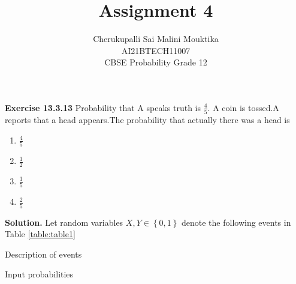 \usepackage{graphicx}
\usepackage{txfonts}

\def\inputGnumericTable{}

\usepackage[latin1]{inputenc}                                 
\usepackage{color}                                            
\usepackage{array}                                            
\usepackage{longtable}                                        
\usepackage{calc}                                             
\usepackage{multirow}                                         
\usepackage{hhline}                                           
\usepackage{ifthen}
\usepackage{caption} 
\captionsetup[table]{skip=3pt}  
\providecommand{\pr}[1]{\ensuremath{\Pr\left(#1\right)}}
\providecommand{\cbrak}[1]{\ensuremath{\left\{#1\right\}}}
\renewcommand{\thefigure}{\arabic{table}}
\renewcommand{\thetable}{\arabic{table}}                                     
                               
\title{Assignment 4}
\author{Cherukupalli Sai Malini Mouktika \\ \normalsize AI21BTECH11007 \\ \vspace*{20pt} \Large CBSE Probability Grade 12}



	\maketitle
	
	\textbf{Exercise 13.3.13} 
        Probability that A speaks truth is  $\frac45$. A coin is tossed.A reports that a head appears.The probability that actually there was a head is\\
\begin{enumerate}
	\item
	$\frac{4}{5}$
	\item
		$\frac{1}{2}$
     \item
	$\frac{1}{5}$
	\item
		$\frac{2}{5}$
		

\end{enumerate}

	
	\textbf{Solution.}
	Let random variables $X, Y \in \cbrak{0,1}$ denote the following events in Table \eqref{table:table1}
	\begin{table}[ht!]
		\centering
		
		\caption{Description of events}
		\label{table:table1}	
	\end{table}
	\begin{table}[ht!]
		\centering
		
		\caption{Input probabilities}
		\label{table:table2}	
	\end{table}	
	

